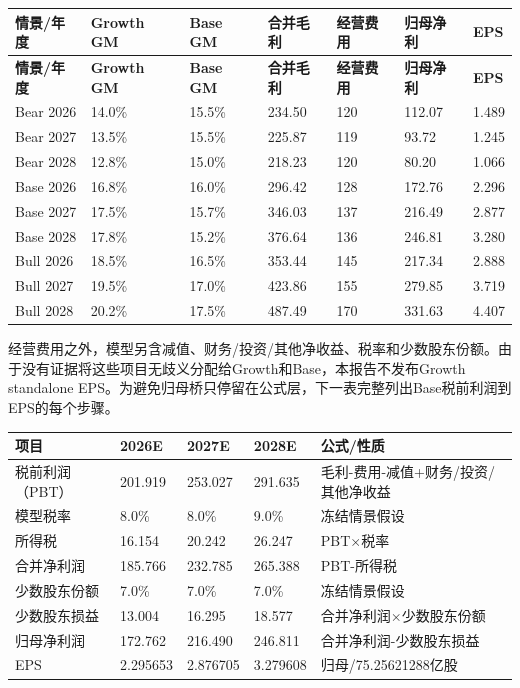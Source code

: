 \scriptsize
\begin{longtable}{L{2.0cm} R{2.0cm} R{2.0cm} R{2.0cm} R{2.0cm} R{2.0cm} R{2.0cm}}
\toprule
\textbf{情景/年度} & \textbf{Growth GM} & \textbf{Base GM} & \textbf{合并毛利} & \textbf{经营费用} & \textbf{归母净利} & \textbf{EPS} \\
\midrule
\endfirsthead
\toprule
\textbf{情景/年度} & \textbf{Growth GM} & \textbf{Base GM} & \textbf{合并毛利} & \textbf{经营费用} & \textbf{归母净利} & \textbf{EPS} \\
\midrule
\endhead
Bear 2026 & 14.0\% & 15.5\% & 234.50 & 120 & 112.07 & 1.489 \\
Bear 2027 & 13.5\% & 15.5\% & 225.87 & 119 & 93.72 & 1.245 \\
Bear 2028 & 12.8\% & 15.0\% & 218.23 & 120 & 80.20 & 1.066 \\
 Base 2026 & 16.8\% & 16.0\% & 296.42 & 128 & 172.76 & 2.296 \\
 Base 2027 & 17.5\% & 15.7\% & 346.03 & 137 & 216.49 & 2.877 \\
 Base 2028 & 17.8\% & 15.2\% & 376.64 & 136 & 246.81 & 3.280 \\
Bull 2026 & 18.5\% & 16.5\% & 353.44 & 145 & 217.34 & 2.888 \\
Bull 2027 & 19.5\% & 17.0\% & 423.86 & 155 & 279.85 & 3.719 \\
Bull 2028 & 20.2\% & 17.5\% & 487.49 & 170 & 331.63 & 4.407 \\
\bottomrule
\end{longtable}
\normalsize

经营费用之外，模型另含减值、财务/投资/其他净收益、税率和少数股东份额。由于没有证据将这些项目无歧义分配给Growth和Base，本报告不发布Growth standalone EPS。为避免归母桥只停留在公式层，下一表完整列出Base税前利润到EPS的每个步骤。

\begin{exhibitbox}
\small
\begin{tabularx}{\exhibitboxwidth}{L{3.8cm}R{2.6cm}R{2.6cm}R{2.6cm}X}
\toprule
\textbf{项目} & \textbf{2026E} & \textbf{2027E} & \textbf{2028E} & \textbf{公式/性质} \\
\midrule
税前利润（PBT） & 201.919 & 253.027 & 291.635 & 毛利-费用-减值+财务/投资/其他净收益 \\
模型税率 & 8.0\% & 8.0\% & 9.0\% & 冻结情景假设 \\
所得税 & 16.154 & 20.242 & 26.247 & PBT\(\times\)税率 \\
合并净利润 & 185.766 & 232.785 & 265.388 & PBT-所得税 \\
少数股东份额 & 7.0\% & 7.0\% & 7.0\% & 冻结情景假设 \\
少数股东损益 & 13.004 & 16.295 & 18.577 & 合并净利润\(\times\)少数股东份额 \\
归母净利润 & 172.762 & 216.490 & 246.811 & 合并净利润-少数股东损益 \\
EPS & 2.295653 & 2.876705 & 3.279608 & 归母/75.25621288亿股 \\
\bottomrule
\end{tabularx}
\end{exhibitbox}

